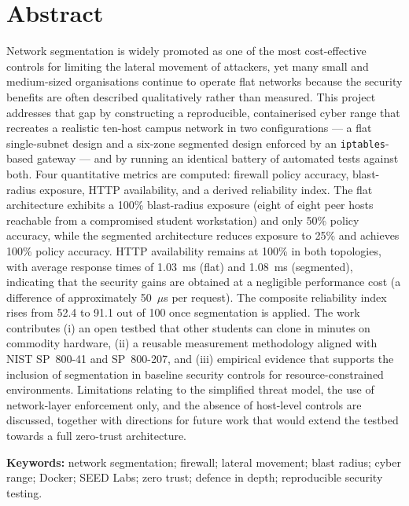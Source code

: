 \chapter*{Abstract}
\thispagestyle{plain}

Network segmentation is widely promoted as one of the most cost-effective controls for limiting the lateral movement of attackers, yet many small and medium-sized organisations continue to operate flat networks because the security benefits are often described qualitatively rather than measured. This project addresses that gap by constructing a reproducible, containerised cyber range that recreates a realistic ten-host campus network in two configurations --- a flat single-subnet design and a six-zone segmented design enforced by an \texttt{iptables}-based gateway --- and by running an identical battery of automated tests against both. Four quantitative metrics are computed: firewall policy accuracy, blast-radius exposure, HTTP availability, and a derived reliability index. The flat architecture exhibits a 100\% blast-radius exposure (eight of eight peer hosts reachable from a compromised student workstation) and only 50\% policy accuracy, while the segmented architecture reduces exposure to 25\% and achieves 100\% policy accuracy. HTTP availability remains at 100\% in both topologies, with average response times of 1.03~ms (flat) and 1.08~ms (segmented), indicating that the security gains are obtained at a negligible performance cost (a difference of approximately 50~$\mu$s per request). The composite reliability index rises from 52.4 to 91.1 out of 100 once segmentation is applied. The work contributes (i) an open testbed that other students can clone in minutes on commodity hardware, (ii) a reusable measurement methodology aligned with NIST SP~800-41 and SP~800-207, and (iii) empirical evidence that supports the inclusion of segmentation in baseline security controls for resource-constrained environments. Limitations relating to the simplified threat model, the use of network-layer enforcement only, and the absence of host-level controls are discussed, together with directions for future work that would extend the testbed towards a full zero-trust architecture.

\vspace{1em}
\noindent\textbf{Keywords:} network segmentation; firewall; lateral movement; blast radius; cyber range; Docker; SEED Labs; zero trust; defence in depth; reproducible security testing.


